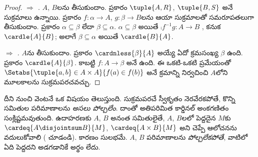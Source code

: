 \documentclass[../../../include/open-logic-section]{subfiles}
\begin{document}
\begin{proof}
\emph{ $\Rightarrow$ .} $A$, $B$లను తీసుకుందాం.  ప్రకారం $\tuple{A, R}$, $\tuple{B, S}$ అనే సుక్రమాలు ఉన్నాయి.  ప్రకారం $f \colon
\alpha \to A$, $g \colon \beta \to B$లను ఆయా సుక్రమాలతో సమరూపతలుగా తీసుకుందాం.  ప్రకారం $\alpha \subseteq \beta$ లేదా $\beta \subseteq \alpha$. $\alpha \subseteq \beta$ అయితే $\comp{f^{-1}}{g} \colon A \to B$ , కనుక $\cardle{A}{B}$; అలాగే $\beta \subseteq \alpha$ అయితే $\cardle{B}{A}$.

\emph{ $\Rightarrow$ .} $A$ను తీసుకుందాం.  ప్రకారం $\cardnless{\beta}{A}$ అయ్యే ఏదో క్రమసంఖ్య $\beta$ ఉంది.  ప్రకారం $\cardle{A}{\beta}$. కాబట్టి $f \colon A \to
\beta$ అనే  ఉంది. ఈ ఒకటి-ఒకటి ప్రమేయంతో $\Setabs{\tuple{a, b} \in A \times A}{f(a)
\in f(b)}$ అనే క్రమాన్ని నిర్వచించి $A$లోని మూలకాలను సుక్రమపరచవచ్చు.
\end{proof}
\noindent
దీని నుంచి వెంటనే ఒక విషయం తెలుస్తుంది. సుక్రమపరచే
స్వీకృతం నెరవేరకపోతే, కొన్ని సమితుల పరిమాణాలను
\emph{అసలు పోల్చలేం}. దాంతో అతిపరిమిత కార్డినల్
అంకగణితం సంక్లిష్టమవుతుంది. ఉదాహరణకు $A$, $B$ అనంత
సమితులైతే, $A$, $B$లలో పెద్దదైన $M$కు
$\cardeq{A \disjointsum B}{M}$, $\cardeq{A \times B}{M}$ అని
చెప్పే ఆలోచనను వదులుకోవాలి (
చూడండి). కారణం సులభమే. $A$, $B$ పరిమాణాలను
\emph{పోల్చలేకపోతే}, వాటిలో ఏది పెద్దదని అడగడానికే అర్థం లేదు.
\end{document}
